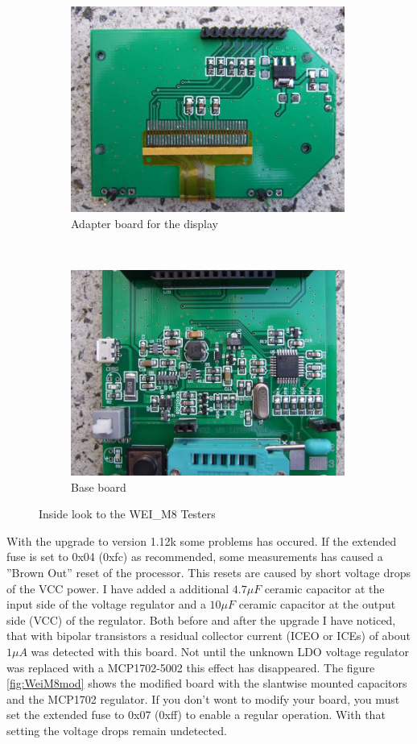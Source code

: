 \begin{figure}[H]
  \begin{subfigure}[b]{9cm}
    \centering
    \includegraphics[width=9cm]{../PNG/WEI_M8_D.JPG}
    \caption{Adapter board for the display}
  \end{subfigure}
  ~
  \begin{subfigure}[b]{9cm}
    \centering
    \includegraphics[width=9cm]{../PNG/WEI_M8_L.JPG}
    \caption{Base board}
  \end{subfigure}
  \caption{Inside look to the WEI\_M8 Testers}
  \label{fig:WeiM8int}
\end{figure}

With the upgrade to version 1.12k some problems has occured.
If the extended fuse is set to 0x04 (0xfc) as recommended, some measurements has
caused a ''Brown Out'' reset of the processor.
This resets are caused by short voltage drops of the VCC power.
I have added a additional \(4.7\mu F\) ceramic capacitor at the input side of
the voltage regulator and a \(10\mu F\) ceramic capacitor at the output side (VCC)
of the regulator.
Both before and after the upgrade I have noticed, that with bipolar transistors
a residual collector current (ICEO or ICEs) of about \(1\mu A\) was detected with this board.
Not until the unknown LDO voltage regulator was replaced with a MCP1702-5002 this
effect has disappeared. The figure \ref{fig:WeiM8mod} shows the modified board with
the slantwise mounted capacitors and the MCP1702 regulator.
If you don't wont to modify your board, you must set the extended fuse to 0x07 (0xff)
to enable a regular operation. With that setting the voltage drops remain undetected.

